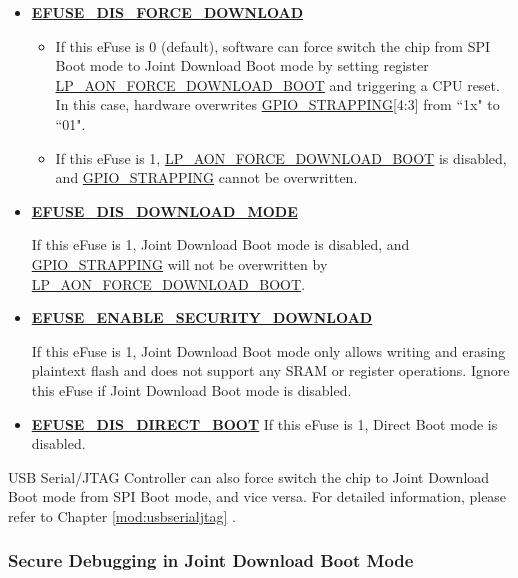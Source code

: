 \documentclass[main\_\_EN.tex]{subfiles}
\begin{document}
\begin{itemize}
    \item \hyperref[fielddesc:EFUSEDISFORCEDOWNLOAD]{\textbf{EFUSE\_DIS\_FORCE\_DOWNLOAD}}
    \begin{itemize}
    \item If this eFuse is 0 (default), software can force switch the chip from SPI Boot mode to Joint Download Boot mode by setting register \hyperref[fielddesc:LPAONFORCEDOWNLOADBOOT]{LP\_AON\_FORCE\_DOWNLOAD\_BOOT} and triggering a CPU reset. In this case, hardware overwrites \hyperref[fielddesc:GPIOSTRAPPING]{GPIO\_STRAPPING}[4:3] from ``1x" to ``01".

    \item If this eFuse is 1, \hyperref[fielddesc:LPAONFORCEDOWNLOADBOOT]{LP\_AON\_FORCE\_DOWNLOAD\_BOOT} is disabled, and \hyperref[fielddesc:GPIOSTRAPPING]{GPIO\_STRAPPING} cannot be overwritten.
    \end{itemize}

    \item \hyperref[fielddesc:EFUSEDISDOWNLOADMODE]{\textbf{EFUSE\_DIS\_DOWNLOAD\_MODE}}

    If this eFuse is 1, Joint Download Boot mode is disabled, and \hyperref[fielddesc:GPIOSTRAPPING]{GPIO\_STRAPPING} will not be overwritten by \hyperref[fielddesc:LPAONFORCEDOWNLOADBOOT]{LP\_AON\_FORCE\_DOWNLOAD\_BOOT}.

    \item \hyperref[fielddesc:EFUSEENABLESECURITYDOWNLOAD]{\textbf{EFUSE\_ENABLE\_SECURITY\_DOWNLOAD}}

    If this eFuse is 1, Joint Download Boot mode only allows writing and erasing plaintext flash and does not support any SRAM or register operations. Ignore this eFuse if Joint Download Boot mode is disabled.
    \item \hyperref[fielddesc:EFUSEDISDIRECTBOOT]{\textbf{EFUSE\_DIS\_DIRECT\_BOOT}}
    If this eFuse is 1, Direct Boot mode is disabled.
\end{itemize}

USB Serial/JTAG Controller can also force switch the chip to Joint Download Boot mode from SPI Boot mode, and vice versa. For detailed information, please refer to Chapter \ref{mod:usbserialjtag} \textit{}.

\subsubsection{Secure Debugging in Joint Download Boot Mode}
\label{sec:bootctrl-secure-debugging}
\end{document}
